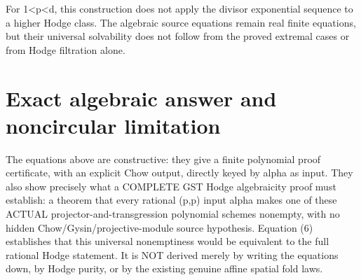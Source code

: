\documentclass[11pt]{article}
\begin{document}
For 1<p<d, this construction does
not apply the divisor exponential
sequence to a higher Hodge class.
The algebraic source equations
remain real finite equations, but
their universal solvability does not
follow from the proved extremal
cases or from Hodge filtration alone.

\section{Exact algebraic answer and noncircular limitation}
The equations above are constructive: they give a finite
polynomial proof certificate, with an explicit Chow output,
directly keyed by alpha as input. They also show precisely
what a COMPLETE GST Hodge algebraicity proof must establish:
a theorem that every rational (p,p) input alpha makes one
of these ACTUAL projector-and-transgression polynomial
schemes nonempty, with no hidden Chow/Gysin/projective-module
source hypothesis. Equation (6) establishes that this
universal nonemptiness would be equivalent to the full
rational Hodge statement. It is NOT derived merely by
writing the equations down, by Hodge purity, or by the
existing genuine affine spatial fold laws.
\end{document}
